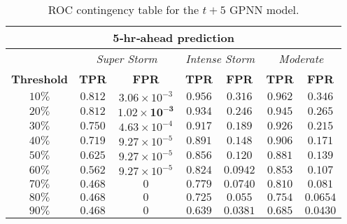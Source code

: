 \begin{table}[ht]
	\centering
	\caption{ROC contingency table for the $t+5$ GPNN model.}
	\label{table:rocgpnn5h}
	\begin{tabular}
		{c| c c | c c | c c}
		\hline
		\multicolumn{7}{c}{\textbf{5‐hr‐ahead prediction}} \\ 
		\hline
		 & \multicolumn{2}{c}{\textit{Super Storm}} & \multicolumn{2}{c}{\textit{Intense Storm}} & \multicolumn{2}{c}{\textit{Moderate}} \\ 
		\hline
		\textbf{Threshold} & \textbf{TPR} & \textbf{FPR} & \textbf{TPR} & \textbf{FPR} & \textbf{TPR} & \textbf{FPR} \\ 
		\hline
		$ 10\%$ & $ 0.812 $ & $3.06\times10^{-3}$ & $ 0.956 $ & $ 0.316 $ & $ 0.962 $ & $0.346$ \\ 
		$ 20\%$ & $\mathbf{0.812}$ & $\mathbf{1.02\times10^{-3}}$ & $ 0.934 $ & $ 0.246 $ & $ 0.945 $ & $0.265$ \\ 
		$ 30\%$ & $ 0.750 $ & $4.63\times10^{-4}$ & $ 0.917 $ & $ 0.189 $ & $ 0.926 $ & $0.215$ \\ 
		$ 40\%$ & $ 0.719 $ & $9.27\times10^{-5}$ & $ 0.891 $ & $ 0.148 $ & $ 0.906 $ & $0.171$ \\ 
		$ 50\%$ & $ 0.625 $ & $9.27\times10^{-5}$ & $\mathbf{0.856}$ & $\mathbf{0.120}$ & $ 0.881 $ & $0.139$ \\ 
		$ 60\%$ & $ 0.562 $ & $9.27\times10^{-5}$ & $ 0.824 $ & $ 0.0942 $ & $\mathbf{0.853}$ & $\mathbf{0.107}$ \\ 
		$ 70\%$ & $ 0.468 $ & $ 0 $ & $ 0.779 $ & $ 0.0740 $ & $ 0.810 $ & $0.081$ \\ 
		$ 80\%$ & $ 0.468 $ & $ 0 $ & $ 0.725 $ & $ 0.055 $ & $ 0.754 $ & $0.0654$ \\ 
		$ 90\%$ & $ 0.468 $ & $ 0 $ & $ 0.639 $ & $ 0.0381 $ & $ 0.685 $ & $0.0430$\\
		\hline
	\end{tabular}
\end{table}

